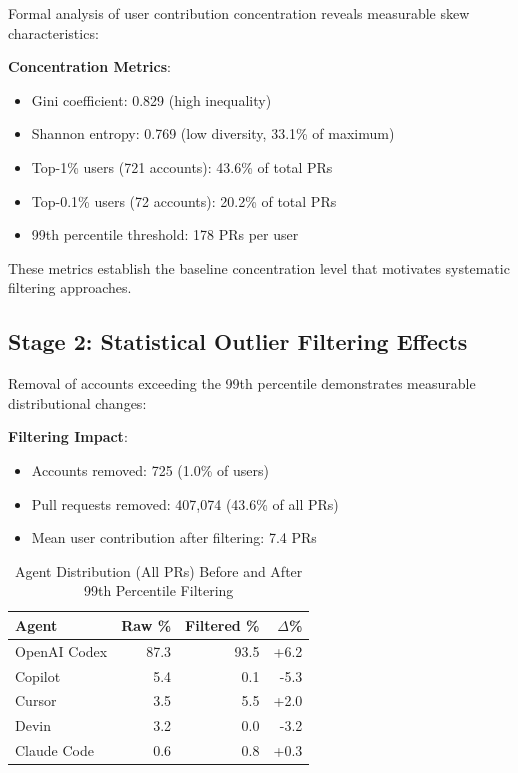 \documentclass[conference]{IEEEtran}
\begin{document}
Formal analysis of user contribution concentration reveals measurable skew characteristics:

\textbf{Concentration Metrics}:
\begin{itemize}
    \item Gini coefficient: 0.829 (high inequality)
    \item Shannon entropy: 0.769 (low diversity, 33.1\% of maximum)
    \item Top-1\% users (721 accounts): 43.6\% of total PRs
    \item Top-0.1\% users (72 accounts): 20.2\% of total PRs
    \item 99th percentile threshold: 178 PRs per user
\end{itemize}

These metrics establish the baseline concentration level that motivates systematic filtering approaches.

\subsection{Stage 2: Statistical Outlier Filtering Effects}

Removal of accounts exceeding the 99th percentile demonstrates measurable distributional changes:

\textbf{Filtering Impact}:
\begin{itemize}
    \item Accounts removed: 725 (1.0\% of users)
    \item Pull requests removed: 407,074 (43.6\% of all PRs)
    \item Mean user contribution after filtering: 7.4 PRs
\end{itemize}

\begin{table}[t]
\centering
\caption{Agent Distribution (All PRs) Before and After 99th Percentile Filtering}
\label{tab:filtering_effects}
\begin{tabular}{@{}lrrr@{}}
\toprule
\textbf{Agent} & \textbf{Raw \%} & \textbf{Filtered \%} & \textbf{$\Delta$\%} \\
\midrule
OpenAI Codex & 87.3 & 93.5 & +6.2 \\
Copilot & 5.4 & 0.1 & -5.3 \\
Cursor & 3.5 & 5.5 & +2.0 \\
Devin & 3.2 & 0.0 & -3.2 \\
Claude Code & 0.6 & 0.8 & +0.3 \\
\bottomrule
\end{tabular}
\end{table}
\end{document}
